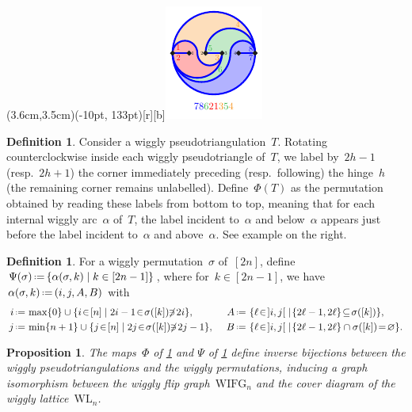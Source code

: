 \documentclass[submission]{FPSAC2025}
\newtheorem{proposition}[theorem]{Proposition}
\theoremstyle{definition}
\newtheorem{definition}[theorem]{Definition}
\newcommand{\set}[2]{\left\{ #1 \;\middle|\; #2 \right\}} %
\newcommand{\eqdef}{\mbox{\,\raisebox{0.2ex}{\scriptsize\ensuremath{\mathrm:}}\ensuremath{=}\,}} %
\newcommand{\wigglyIncreasingFlipGraph}{\mathrm{WIFG}} %
\newcommand{\wigglyLattice}{\mathrm{WL}} %
\begin{document}

\parpic(3.6cm,3.5cm)(-10pt, 133pt)[r][b]{\includegraphics[scale=2]{bijection}}{
\begin{definition}
\label{def:bijection1}
Consider a wiggly pseudotriangulation~$T$.
Rotating counterclockwise inside each wiggly pseudotriangle of~$T$, we label by~$2h-1$ (resp.~$2h+1$) the corner immediately preceding (resp.~following) the hinge~$h$ (the remaining corner remains unlabelled).
Define~$\Phi(T)$ as the permutation obtained by reading these labels from bottom to top, meaning that for each internal wiggly arc~$\alpha$ of~$T$, the label incident to~$\alpha$ and below~$\alpha$ appears just before the label incident to~$\alpha$ and above~$\alpha$.
See example on the right.
\end{definition}

\begin{definition}
\label{def:bijection2}
For a wiggly permutation~$\sigma$ of~$[2n]$, define~$\Psi(\sigma) \eqdef\! \set{\alpha(\sigma, k)}{k \in [2n-1]}$, where for~$k \in [2n-1]$, we have~$\alpha(\sigma, k) \eqdef ( i, j, A, B)$ with
\begin{alignat*}{3}
i & \eqdef \max \{0\} \cup \set{i \!\in\! [n]}{2i-1 \!\in\! \sigma([k]) \!\!\not\ni\! 2i}\!, \quad &
A & \eqdef \set{\ell \!\in\! {]i,j[}}{\!\{2\ell-1, 2\ell\} \!\subseteq\! \sigma([k])}\!, \\
j & \eqdef \min \{n+1\} \cup \set{j \!\in\! [n]}{2j \!\in\! \sigma([k]) \!\!\not\ni\! 2j-1}\!, \;\, &
B & \eqdef \set{\ell \!\in\! {]i,j[}}{\!\{2\ell-1, 2\ell\} \cap \sigma([k]) \!=\! \varnothing} \!.
\end{alignat*}
\end{definition}
}

\begin{proposition}
\label{prop:bijection}
The maps~$\Phi$ of \cref{def:bijection1} and $\Psi$ of \cref{def:bijection2} define inverse bijections between the wiggly pseudotriangulations and the wiggly permutations, inducing a graph isomorphism between the wiggly flip graph~$\wigglyIncreasingFlipGraph_n$ and the cover diagram of the wiggly lattice~$\wigglyLattice_n$.
\end{proposition}
\end{document}
